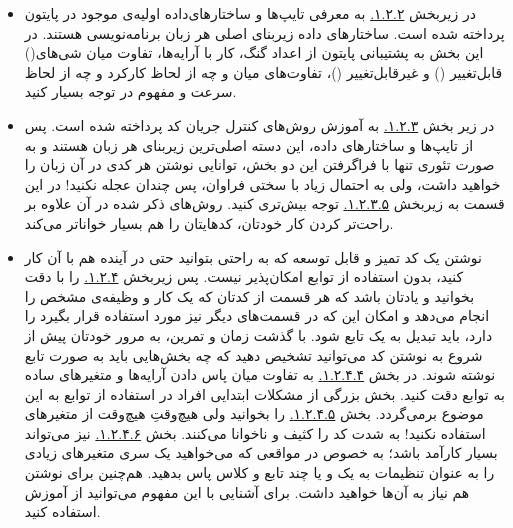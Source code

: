 \documentclass[11pt, a4paper]{article}
\begin{document}
\begin{itemize}[label=\Large $\bullet$]
	\item 
  در زیربخش 
  \href{https://scipy-lectures.org/intro/language/basic_types.html}{۱.۲.۲.}
  به معرفی تایپ‌ها و ساختارهای‌داده‌ اولیه‌ی موجود در پایتون پرداخته شده است.
  ساختارهای داده زیربنای اصلی هر زبان برنامه‌نویسی هستند.
  در این بخش به پشتیبانی پایتون از اعداد گنگ،
  کار با آرایه‌ها،
  تفاوت میان 
  شی‌های()
  قابل‌تغییر
  ()
  و
  غیرقابل‌تغییر
  ()،
  تفاوت‌های میان
  و
  چه از لحاظ کارکرد و چه از لحاظ سرعت و مفهوم
  در
  توجه بسیار کنید.

  \item 
  در زیر بخش
  \href{https://scipy-lectures.org/intro/language/control_flow.html}{۱.۲.۳.}
  به آموزش روش‌های کنترل جریان کد پرداخته شده است.
  پس از تایپ‌ها و ساختارهای داده، این دسته اصلی‌ترین زیربنای هر زبان هستند
  و به صورت تئوری تنها با فراگرفتن این دو بخش،
  توانایی نوشتن هر کدی در آن زبان را خواهید داشت، ولی به احتمال زیاد با سختی‌ فراوان،
  پس چندان عجله نکنید!
  در این قسمت به زیربخش
  \href{https://scipy-lectures.org/intro/language/control_flow.html#advanced-iteration}{۱.۲.۳.۵.}
  توجه بیش‌تری کنید.
  روش‌های ذکر شده در آن علاوه بر راحت‌تر کردن کار خودتان،
  کدهایتان را هم بسیار خواناتر می‌کند.

  \item
  نوشتن یک کد تمیز و قابل توسعه که به راحتی بتوانید حتی در آینده هم با آن کار کنید،
  بدون استفاده از توابع امکان‌پذیر نیست.
  پس زیربخش
  \href{https://scipy-lectures.org/intro/language/functions.html}{۱.۲.۴.}
  را با دقت بخوانید و یادتان باشد که هر قسمت از کدتان که یک کار و وظیفه‌ی مشخص را انجام می‌دهد
  و امکان این‌ که در قسمت‌های دیگر نیز مورد استفاده قرار بگیرد را دارد،
  باید تبدیل به یک تابع شود.
  با گذشت زمان و تمرین،
  به مرور خودتان پیش از شروع به نوشتن کد می‌توانید تشخیص دهید که چه بخش‌هایی باید به صورت تابع نوشته شوند.
  در بخش
  \href{https://scipy-lectures.org/intro/language/functions.html#passing-by-value}{۱.۲.۴.۴.}
  به تفاوت میان پاس دادن آرایه‌ها و متغیر‌های ساده به توابع دقت کنید.
  بخش بزرگی از مشکلات ابتدایی افراد در استفاده از توابع به این موضوع برمی‌گردد.
  بخش
  \href{https://scipy-lectures.org/intro/language/functions.html#global-variables}{۱.۲.۴.۵.}
  را بخوانید ولی هیچ‌وقتِ هیچ‌وقت از متغیر‌های
  استفاده نکنید!
  به شدت کد را کثیف و ناخوانا می‌کنند.
  بخش
  \href{https://scipy-lectures.org/intro/language/functions.html#variable-number-of-parameters}{۱.۲.۴.۶.}
  نیز می‌تواند بسیار کارآمد باشد؛ به خصوص در مواقعی که می‌خواهید یک سری متغیر‌های زیادی را به عنوان
  تنظیمات به یک و یا چند تابع و کلاس پاس بدهید.
  هم‌چنین برای نوشتن
  هم نیاز به آن‌ها خواهید داشت.
  برای آشنایی با این مفهوم می‌توانید از آموزش
  \href{https://www.geeksforgeeks.org/function-wrappers-in-python/}{}
  استفاده کنید.


\end{itemize}
\end{document}
